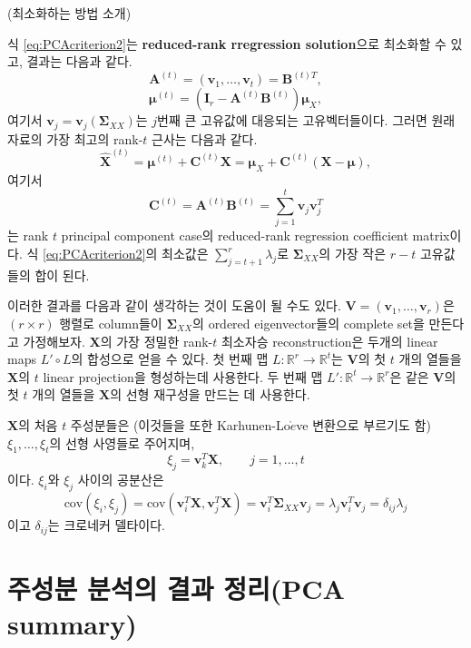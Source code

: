 \documentclass[b5paper,]{scrbook}
\theoremstyle{plain}
\theoremstyle{definition}
\numberwithin{equation}{section}
\begin{document}
(최소화하는 방법 소개)

식 \eqref{eq:PCAcriterion2}는 \textbf{reduced-rank rregression solution}으로 최소화할 수 있고, 결과는 다음과 같다.
\[\mathbf{A}^{(t)}=(\mathbf{v}_{1},\ldots, \mathbf{v}_{t})=\mathbf{B}^{(t)T},\]
\[\boldsymbol{\mu}^{(t)}=(\mathbf{I}_{r}-\mathbf{A}^{(t)}\mathbf{B}^{(t)})\boldsymbol{\mu}_{X},\]
여기서 \(\mathbf{v}_{j}=\mathbf{v}_{j}(\boldsymbol{\Sigma}_{XX})\)는 \(j\)번째 큰 고유값에 대응되는 고유벡터들이다. 그러면 원래 자료의 가장 최고의 rank-\(t\) 근사는 다음과 같다.
\[\hat{\mathbf{X}}^{(t)}=\boldsymbol{\mu}^{(t)}+\mathbf{C}^{(t)}\mathbf{X}=\boldsymbol{\mu}_{X}+\mathbf{C}^{(t)}(\mathbf{X}-\boldsymbol{\mu}),\]
여기서
\[\mathbf{C}^{(t)}=\mathbf{A}^{(t)}\mathbf{B}^{(t)}=\sum_{j=1}^{t}\mathbf{v}_{j}\mathbf{v}_{j}^{T}\]
는 rank \(t\) principal component case의 reduced-rank regression coefficient matrix이다. 식 \eqref{eq:PCAcriterion2}의 최소값은 \(\sum_{j=t+1}^{r}\lambda_{j}\)로 \(\boldsymbol{\Sigma}_{XX}\)의 가장 작은 \(r-t\) 고유값들의 합이 된다.

이러한 결과를 다음과 같이 생각하는 것이 도움이 될 수도 있다. \(\mathbf{V}=(\mathbf{v}_{1},\ldots, \mathbf{v}_{r})\)은 \((r\times r)\) 행렬로 column들이 \(\boldsymbol{\Sigma}_{XX}\)의 ordered eigenvector들의 complete set을 만든다고 가정해보자. \(\mathbf{X}\)의 가장 정밀한 rank-\(t\) 최소자승 reconstruction은 두개의 linear maps \(L'\circ L\)의 합성으로 얻을 수 있다. 첫 번째 맵 \(L:\mathbb{R}^{r} \rightarrow \mathbb{R}^{t}\)는 \(\mathbf{V}\)의 첫 \(t\) 개의 열들을 \(\mathbf{X}\)의 \(t\) linear projection을 형성하는데 사용한다. 두 번째 맵 \(L':\mathbb{R}^{t}\rightarrow \mathbb{R}^{r}\)은 같은 \(\mathbf{V}\)의 첫 \(t\) 개의 열들을 \(\mathbf{X}\)의 선형 재구성을 만드는 데 사용한다.

\(\mathbf{X}\)의 처음 \(t\) 주성분들은 (이것들을 또한 Karhunen-Lo\(\grave{e}\)ve 변환으로 부르기도 함) \(\xi_{1},\ldots, \xi_{t}\)의 선형 사영들로 주어지며,
\[\xi_{j}=\mathbf{v}_{k}^{T}\mathbf{X}, \qquad{j=1,\ldots, t}\]
이다. \(\xi_{i}\)와 \(\xi_{j}\) 사이의 공분산은
\[\text{cov}(\xi_{i},\xi_{j})=\text{cov}(\mathbf{v}_{i}^{T}\mathbf{X}, \mathbf{v}_{j}^{T}\mathbf{X})=\mathbf{v}_{i}^{T}\boldsymbol{\Sigma}_{XX}\mathbf{v}_{j}=\lambda_{j}\mathbf{v}_{i}^{T}\mathbf{v}_{j}=\delta_{ij}\lambda_{j}\]
이고 \(\delta_{ij}\)는 크로네커 델타이다.

\hypertarget{---pca-summary}{%
\section{주성분 분석의 결과 정리(PCA summary)}\label{---pca-summary}}
\end{document}
